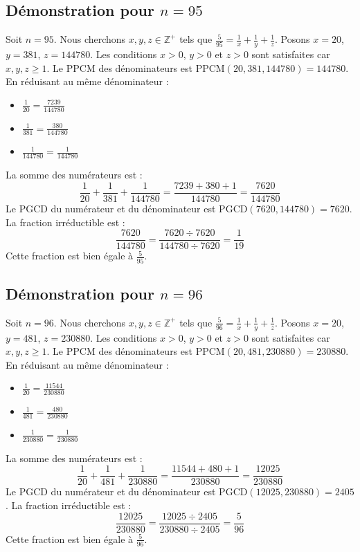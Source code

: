 \documentclass[11pt,a4paper]{article}
\begin{document}
\subsection{Démonstration pour $n = 95$}
Soit $n = 95$. Nous cherchons $x, y, z \in \mathbb{Z}^{+}$ tels que $\frac{5}{95} = \frac{1}{x} + \frac{1}{y} + \frac{1}{z}$.
Posons $x = 20$, $y = 381$, $z = 144780$.
Les conditions $x > 0$, $y > 0$ et $z > 0$ sont satisfaites car $x, y, z \geq 1$.
Le PPCM des dénominateurs est $\text{PPCM}(20, 381, 144780) = 144780$.
En réduisant au même dénominateur :
\begin{itemize}
    \item $\frac{1}{20} = \frac{7239}{144780}$
    \item $\frac{1}{381} = \frac{380}{144780}$
    \item $\frac{1}{144780} = \frac{1}{144780}$
\end{itemize}
La somme des numérateurs est :
$$ \frac{1}{20} + \frac{1}{381} + \frac{1}{144780} = \frac{7239 + 380 + 1}{144780} = \frac{7620}{144780} $$
Le PGCD du numérateur et du dénominateur est $\text{PGCD}(7620, 144780) = 7620$.
La fraction irréductible est :
$$ \frac{7620}{144780} = \frac{7620 \div 7620}{144780 \div 7620} = \frac{1}{19} $$
Cette fraction est bien égale à $\frac{5}{95}$.

\subsection{Démonstration pour $n = 96$}
Soit $n = 96$. Nous cherchons $x, y, z \in \mathbb{Z}^{+}$ tels que $\frac{5}{96} = \frac{1}{x} + \frac{1}{y} + \frac{1}{z}$.
Posons $x = 20$, $y = 481$, $z = 230880$.
Les conditions $x > 0$, $y > 0$ et $z > 0$ sont satisfaites car $x, y, z \geq 1$.
Le PPCM des dénominateurs est $\text{PPCM}(20, 481, 230880) = 230880$.
En réduisant au même dénominateur :
\begin{itemize}
    \item $\frac{1}{20} = \frac{11544}{230880}$
    \item $\frac{1}{481} = \frac{480}{230880}$
    \item $\frac{1}{230880} = \frac{1}{230880}$
\end{itemize}
La somme des numérateurs est :
$$ \frac{1}{20} + \frac{1}{481} + \frac{1}{230880} = \frac{11544 + 480 + 1}{230880} = \frac{12025}{230880} $$
Le PGCD du numérateur et du dénominateur est $\text{PGCD}(12025, 230880) = 2405$.
La fraction irréductible est :
$$ \frac{12025}{230880} = \frac{12025 \div 2405}{230880 \div 2405} = \frac{5}{96} $$
Cette fraction est bien égale à $\frac{5}{96}$.
\end{document}
